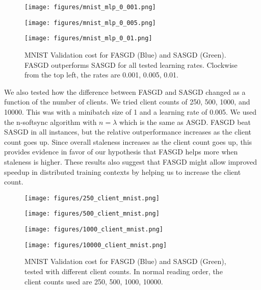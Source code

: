 \documentclass{article} %
\begin{document}
\begin{figure}[ht!]
  \centering
  \begin{minipage}[b]{0.5\linewidth}
    \texttt{[image: figures/mnist\_mlp\_0\_001.png]}
  \end{minipage}%
  \begin{minipage}[b]{0.5\linewidth}
    \texttt{[image: figures/mnist\_mlp\_0\_005.png]}
  \end{minipage} 
  \begin{minipage}[b]{0.5\linewidth}
    \texttt{[image: figures/mnist\_mlp\_0\_01.png]}
  \end{minipage}%
  \caption{MNIST Validation cost for FASGD (Blue) and SASGD (Green).
  FASGD outperforms SASGD for all tested learning rates. 
  Clockwise from the top left, the rates are 0.001, 0.005, 0.01.
  }
  \label{fig1} 
\end{figure}

We also tested how the difference between FASGD and SASGD changed as a function of the number of clients.
We tried client counts of 250, 500, 1000, and 10000.
This was with a minibatch size of 1 and a learning rate of 0.005.
We used the n-softsync algorithm with $n = \lambda$ which is the same as ASGD.
FASGD beat SASGD in all instances, but the relative outperformance increases as the client count goes up.
Since overall staleness increases as the client count goes up, this provides evidence in favor of our hypothesis
that FASGD helps more when staleness is higher.
These results also suggest that FASGD might allow improved speedup in distributed training contexts
by helping us to increase the client count.

\begin{figure}[ht!]
  \centering
  \begin{minipage}[b]{0.5\linewidth}
    \texttt{[image: figures/250\_client\_mnist.png]}
  \end{minipage}%
  \begin{minipage}[b]{0.5\linewidth}
    \texttt{[image: figures/500\_client\_mnist.png]}
  \end{minipage} 
  \begin{minipage}[b]{0.5\linewidth}
    \texttt{[image: figures/1000\_client\_mnist.png]}
  \end{minipage}%
  \begin{minipage}[b]{0.5\linewidth}
    \texttt{[image: figures/10000\_client\_mnist.png]}
  \end{minipage}%
  \caption{MNIST Validation cost for FASGD (Blue) and SASGD (Green),
    tested with different client counts.
    In normal reading order, the client counts used are 250, 500,
    1000, 10000.
  }
  \label{fig2} 
\end{figure}
\end{document}
